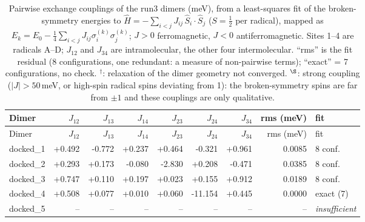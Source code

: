 
\begin{longtable}{@{}lrrrrrrrl@{}}
\caption{Pairwise exchange couplings of the run3 dimers (meV), from a least-squares fit of the
         broken-symmetry energies to $\hat H = -\sum_{i<j} J_{ij}\,\hat S_i\cdot\hat S_j$ ($S=\tfrac12$ per
         radical), mapped as $E_k=E_0-\tfrac14\sum_{i<j}J_{ij}\sigma_i^{(k)}\sigma_j^{(k)}$; $J>0$ ferromagnetic,
         $J<0$ antiferromagnetic. Sites 1--4 are radicals A--D; $J_{12}$ and $J_{34}$ are intramolecular,
         the other four intermolecular. ``rms'' is the fit residual (8 configurations, one
         redundant: a measure of non-pairwise terms); ``exact'' = 7 configurations, no check.
         $^{\dagger}$: relaxation of the dimer geometry not converged. $^{\S}$: strong coupling
         ($|J|>50$\,meV, or high-spin radical spins deviating from 1): the broken-symmetry
         spins are far from $\pm1$ and these couplings are only qualitative.}\label{tab:run3_exchange}\\
\toprule
Dimer & $J_{12}$ & $J_{13}$ & $J_{14}$ & $J_{23}$ & $J_{24}$ & $J_{34}$ & rms (meV) & fit \\
\midrule
\endfirsthead
\toprule
Dimer & $J_{12}$ & $J_{13}$ & $J_{14}$ & $J_{23}$ & $J_{24}$ & $J_{34}$ & rms (meV) & fit \\
\midrule
\endhead
\bottomrule
\endlastfoot
docked\_1 & +0.492 & -0.772 & +0.237 & +0.464 & -0.321 & +0.961 & 0.0085 & 8 conf. \\
docked\_2 & +0.293 & +0.173 & -0.080 & -2.830 & +0.208 & -0.471 & 0.0385 & 8 conf. \\
docked\_3 & +0.747 & +0.110 & +0.197 & +0.023 & +0.155 & +0.912 & 0.0189 & 8 conf. \\
docked\_4 & +0.508 & +0.077 & +0.010 & +0.060 & -11.154 & +0.445 & 0.0000 & exact (7) \\
docked\_5 & -- & -- & -- & -- & -- & -- & -- & \textit{insufficient} \\
\end{longtable}
